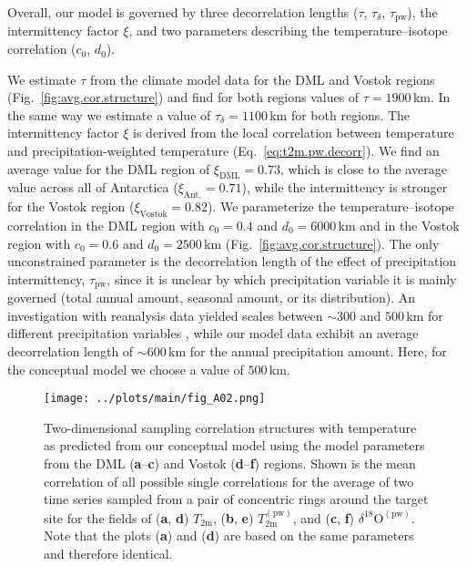 \documentclass[cp]{copernicus}
\begin{document}
Overall, our model is governed by three decorrelation lengths ($\tau$,
$\tau_{\delta}$, $\tau_{\mathrm{pw}}$), the intermittency factor $\xi$, and two
parameters describing the temperature--isotope correlation ($c_0$, $d_0$).

We estimate $\tau$ from the climate model data for the DML and Vostok regions
(Fig.~\ref{fig:avg.cor.structure}) and find for both regions values of
$\tau=1900$\,km. In the same way we estimate a value of $\tau_{\delta}=1100$\,km
for both regions. The intermittency factor $\xi$ is derived from the local
correlation between temperature and precipitation-weighted temperature
(Eq.~\ref{eq:t2m.pw.decorr}). We find an average value for the DML region of
$\xi_{\mathrm{DML}}=0.73$, which is close to the average value across all of
Antarctica ($\xi_{\mathrm{Ant.}}=0.71$), while the intermittency is stronger for
the Vostok region ($\xi_{\mathrm{Vostok}}=0.82$). We parameterize the
temperature--isotope correlation in the DML region with $c_0=0.4$ and
$d_0=6000$\,km and in the Vostok region with $c_0=0.6$ and $d_0=2500$\,km
(Fig.~\ref{fig:avg.cor.structure}). The only unconstrained parameter is the
decorrelation length of the effect of precipitation intermittency,
$\tau_{\mathrm{pw}}$, since it is unclear by which precipitation variable it is
mainly governed (total annual amount, seasonal amount, or its distribution). An
investigation with reanalysis data yielded scales between $\sim300$ and
$500$\,km for different precipitation variables \citep{Munch2018a}, while our
model data exhibit an average decorrelation length of $\sim600$\,km for the
annual precipitation amount. Here, for the conceptual model we choose a value of
$500$\,km.

\begin{figure*}[t]%
\centering
\texttt{[image: ../plots/main/fig\_A02.png]}
\caption{%
  Two-dimensional sampling correlation structures with temperature as predicted
  from our conceptual model using the model parameters from the DML
  (\textbf{a}--\textbf{c}) and Vostok (\textbf{d}--\textbf{f}) regions. Shown is
  the mean correlation of all possible single correlations for the average of
  two time series sampled from a pair of concentric rings around the target site
  for the fields of (\textbf{a}, \textbf{d}) $T_{\mathrm{2m}}$, (\textbf{b},
  \textbf{e}) $T_{\mathrm{2m}}^{\mathrm{(pw)}}$, and (\textbf{c}, \textbf{f})
  $\delta^{18}\mathrm{O}^{\mathrm{(pw)}}$. Note that the plots (\textbf{a}) and
  (\textbf{d}) are based on the same parameters and therefore identical.}
\label{fig:conceptual.model}%
\end{figure*}%
\end{document}
